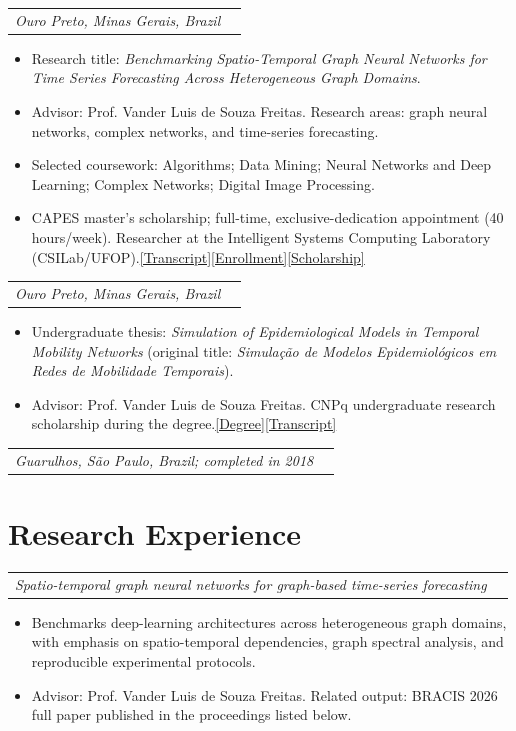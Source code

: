 \documentclass[10pt]{article}
\makeatletter
\newcommand{\doclink}[2]{\nobreak\hspace{0.22em}\href{#1}{{\footnotesize\color{accent}[#2]}}}
\newcommand{\UGDiplomaURL}{https://drive.google.com/file/d/1chQ3eVqyCNRk-2CAmvl_kJQ4CWrkX2Yp/view}
\newcommand{\UGTranscriptURL}{https://drive.google.com/file/d/1OBzErz3kYH--toXf83PsePZqkfEUumNN/view}
\newcommand{\MScTranscriptURL}{https://drive.google.com/file/d/1dxias6IFazUcAOIyIbnxrxs3XYbOT12-/view}
\newcommand{\MScEnrollmentURL}{https://drive.google.com/file/d/14dFctLfD1CDWOStPQH6IcHsW_TzsKEXJ/view}
\newcommand{\CAPESURL}{https://drive.google.com/file/d/1-h8EWgQBNVSRdlaRFe6iMyCkw39tIIzj/view}
\newcommand{\SecondaryTranscriptURL}{https://drive.google.com/file/d/1vZVNAv6xCK-i_CAacHGebIcbC6LpFIFx/view?usp=sharing}
\newcommand{\entry}[3]{%
  \needspace{2.5\baselineskip}%
  \begin{tabularx}{\linewidth}{@{}X>{\raggedleft\arraybackslash}p{2.35cm}@{}}
    \textbf{#1} & {\color{muted}\small #2}\\[-0.08em]
    \multicolumn{2}{@{}p{\linewidth}@{}}{{\itshape #3}}
  \end{tabularx}\par
}
\makeatother
\begin{document}
\entry{M.Sc. in Computer Science --- Federal University of Ouro Preto (UFOP)}{2025--present}{Ouro Preto, Minas Gerais, Brazil}
\begin{itemize}
  \item Research title: \emph{Benchmarking Spatio-Temporal Graph Neural Networks for Time Series Forecasting Across Heterogeneous Graph Domains}.
  \item Advisor: Prof. Vander Luis de Souza Freitas. Research areas: graph neural networks, complex networks, and time-series forecasting.
  \item Selected coursework: Algorithms; Data Mining; Neural Networks and Deep Learning; Complex Networks; Digital Image Processing.
  \item CAPES master's scholarship; full-time, exclusive-dedication appointment (40 hours/week). Researcher at the Intelligent Systems Computing Laboratory (CSILab/UFOP).\doclink{\MScTranscriptURL}{Transcript}\doclink{\MScEnrollmentURL}{Enrollment}\doclink{\CAPESURL}{Scholarship}
\end{itemize}

\entry{B.Sc. in Physics --- Federal University of Ouro Preto (UFOP)}{2019--2025}{Ouro Preto, Minas Gerais, Brazil}
\begin{itemize}
  \item Undergraduate thesis: \emph{Simulation of Epidemiological Models in Temporal Mobility Networks} (original title: \emph{Simulação de Modelos Epidemiológicos em Redes de Mobilidade Temporais}).
  \item Advisor: Prof. Vander Luis de Souza Freitas. CNPq undergraduate research scholarship during the degree.\doclink{\UGDiplomaURL}{Degree}\doclink{\UGTranscriptURL}{Transcript}
\end{itemize}

\entry{Secondary Education --- Colégio Batista de Guarulhos (CBG)\doclink{\SecondaryTranscriptURL}{Transcript}}{2016--2018}{Guarulhos, São Paulo, Brazil; completed in 2018}

\section{Research Experience}

\entry{Graduate Researcher and CAPES Fellow --- CSILab/UFOP\doclink{\CAPESURL}{Scholarship}}{2025--present}{Spatio-temporal graph neural networks for graph-based time-series forecasting}
\begin{itemize}
  \item Benchmarks deep-learning architectures across heterogeneous graph domains, with emphasis on spatio-temporal dependencies, graph spectral analysis, and reproducible experimental protocols.
  \item Advisor: Prof. Vander Luis de Souza Freitas. Related output: BRACIS 2026 full paper published in the proceedings listed below.
\end{itemize}
\end{document}
